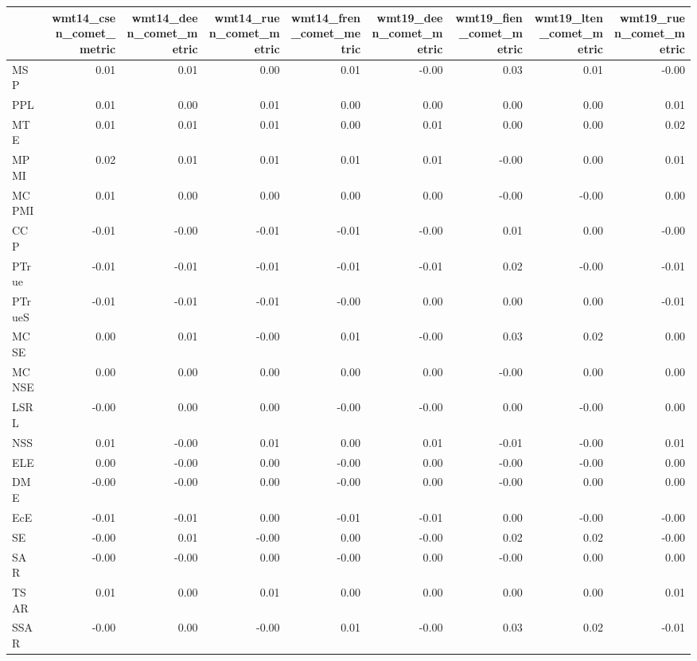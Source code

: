 \begin{tabular}{lrrrrrrrr}
\toprule
 & wmt14\_csen\_comet\_metric & wmt14\_deen\_comet\_metric & wmt14\_ruen\_comet\_metric & wmt14\_fren\_comet\_metric & wmt19\_deen\_comet\_metric & wmt19\_fien\_comet\_metric & wmt19\_lten\_comet\_metric & wmt19\_ruen\_comet\_metric \\
\midrule
MSP & 0.01 & 0.01 & 0.00 & 0.01 & -0.00 & 0.03 & 0.01 & -0.00 \\
PPL & 0.01 & 0.00 & 0.01 & 0.00 & 0.00 & 0.00 & 0.00 & 0.01 \\
MTE & 0.01 & 0.01 & 0.01 & 0.00 & 0.01 & 0.00 & 0.00 & 0.02 \\
MPMI & 0.02 & 0.01 & 0.01 & 0.01 & 0.01 & -0.00 & 0.00 & 0.01 \\
MCPMI & 0.01 & 0.00 & 0.00 & 0.00 & 0.00 & -0.00 & -0.00 & 0.00 \\
CCP & -0.01 & -0.00 & -0.01 & -0.01 & -0.00 & 0.01 & 0.00 & -0.00 \\
PTrue & -0.01 & -0.01 & -0.01 & -0.01 & -0.01 & 0.02 & -0.00 & -0.01 \\
PTrueS & -0.01 & -0.01 & -0.01 & -0.00 & 0.00 & 0.00 & 0.00 & -0.01 \\
MCSE & 0.00 & 0.01 & -0.00 & 0.01 & -0.00 & 0.03 & 0.02 & 0.00 \\
MCNSE & 0.00 & 0.00 & 0.00 & 0.00 & 0.00 & -0.00 & 0.00 & 0.00 \\
LSRL & -0.00 & 0.00 & 0.00 & -0.00 & -0.00 & 0.00 & -0.00 & 0.00 \\
NSS & 0.01 & -0.00 & 0.01 & 0.00 & 0.01 & -0.01 & -0.00 & 0.01 \\
ELE & 0.00 & -0.00 & 0.00 & -0.00 & 0.00 & -0.00 & -0.00 & 0.00 \\
DME & -0.00 & -0.00 & 0.00 & -0.00 & 0.00 & -0.00 & 0.00 & 0.00 \\
EcE & -0.01 & -0.01 & 0.00 & -0.01 & -0.01 & 0.00 & -0.00 & -0.00 \\
SE & -0.00 & 0.01 & -0.00 & 0.00 & -0.00 & 0.02 & 0.02 & -0.00 \\
SAR & -0.00 & -0.00 & 0.00 & -0.00 & 0.00 & -0.00 & 0.00 & 0.00 \\
TSAR & 0.01 & 0.00 & 0.01 & 0.00 & 0.00 & 0.00 & 0.00 & 0.01 \\
SSAR & -0.00 & 0.00 & -0.00 & 0.01 & -0.00 & 0.03 & 0.02 & -0.01 \\
\bottomrule
\end{tabular}
